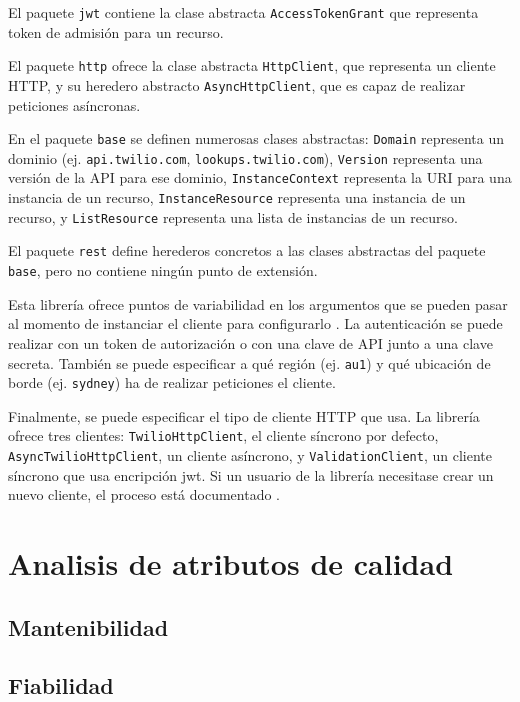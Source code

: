 \documentclass{article}
\begin{document}
El paquete \verb|jwt| contiene la clase abstracta \verb|AccessTokenGrant|
que representa token de admisión para un recurso.

El paquete \verb|http| ofrece la clase abstracta
\verb|HttpClient|, que representa un cliente HTTP,
y su heredero abstracto \verb|AsyncHttpClient|,
que es capaz de realizar peticiones asíncronas.

En el paquete \verb|base| se definen numerosas clases abstractas:
\verb|Domain| representa un dominio
(ej. \verb|api.twilio.com|, \verb|lookups.twilio.com|),
\verb|Version| representa una versión de la API para ese dominio,
\verb|InstanceContext| representa la URI para una instancia de un recurso,
\verb|InstanceResource| representa una instancia de un recurso,
y \verb|ListResource| representa una lista de instancias de un recurso.

El paquete \verb|rest| define herederos concretos a las clases abstractas
del paquete \verb|base|, pero no contiene ningún punto de extensión.

\hfill

Esta librería ofrece puntos de variabilidad
en los argumentos que se pueden pasar
al momento de instanciar el cliente para configurarlo
\cite{readme}.
La autenticación se puede realizar con un token de autorización o
con una clave de API junto a una clave secreta.
También se puede especificar a qué región (ej. \verb|au1|)
y qué ubicación de borde (ej. \verb|sydney|)
ha de realizar peticiones el cliente.

Finalmente, se puede especificar el tipo de cliente HTTP que usa.
La librería ofrece tres clientes:
\verb|TwilioHttpClient|, el cliente síncrono por defecto,
\verb|AsyncTwilioHttpClient|, un cliente asíncrono, y
\verb|ValidationClient|, un cliente síncrono que usa encripción jwt.
Si un usuario de la librería necesitase crear un nuevo cliente,
el proceso está documentado
\cite{crear-cliente-http}.

\section{Analisis de atributos de calidad}

\subsection{Mantenibilidad}

\subsection{Fiabilidad}
\end{document}
